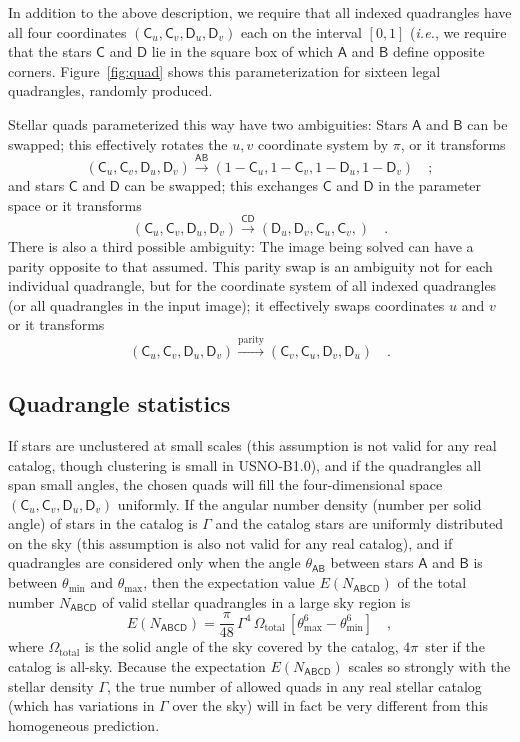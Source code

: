 \documentclass[12pt,preprint]{aastex}
\newcommand{\latin}[1]{\textit{#1}}
\newcommand{\ie}{\latin{i.e.}}
\newcommand{\usnob}{USNO-B1.0}
\newcommand{\starlabel}[1]{\mathsf{#1}}
\newcommand{\AAA}{\starlabel{A}}
\newcommand{\BBB}{\starlabel{B}}
\newcommand{\CCC}{\starlabel{C}}
\newcommand{\DDD}{\starlabel{D}}
\newcommand{\NABCD}{N_{\AAA\BBB\CCC\DDD}}
\newcommand{\ENABCD}{E(\NABCD)}
\newcommand{\thetaAB}{\theta_{\AAA\BBB}}
\newcommand{\thetamin}{\theta_\mathrm{min}}
\newcommand{\thetamax}{\theta_\mathrm{max}}
\begin{document}
In addition to the above description, we require that all indexed
quadrangles have all four coordinates $(\CCC_u,\CCC_v,\DDD_u,\DDD_v)$
each on the interval $[0,1]$ (\ie, we require that the stars $\CCC$
and $\DDD$ lie in the square box of which $\AAA$ and $\BBB$ define
opposite corners.  Figure~\ref{fig:quad} shows this parameterization
for sixteen legal quadrangles, randomly produced.

Stellar quads parameterized this way have two ambiguities:  Stars
$\AAA$ and $\BBB$ can be swapped; this effectively rotates the $u,v$
coordinate system by $\pi$, or it transforms
\begin{equation}
(\CCC_u,\CCC_v,\DDD_u,\DDD_v) \stackrel{\AAA\BBB}{\rightarrow}
  (1-\CCC_u,1-\CCC_v,1-\DDD_u,1-\DDD_v) \quad ;
\end{equation}
and stars $\CCC$ and $\DDD$ can be swapped; this exchanges $\CCC$ and
$\DDD$ in the parameter space or it transforms
\begin{equation}
(\CCC_u,\CCC_v,\DDD_u,\DDD_v) \stackrel{\CCC\DDD}{\rightarrow}
  (\DDD_u,\DDD_v,\CCC_u,\CCC_v,) \quad .
\end{equation}
There is also a third possible ambiguity: The image being solved can
have a parity opposite to that assumed.  This parity swap is an
ambiguity not for each individual quadrangle, but for the coordinate
system of all indexed quadrangles (or all quadrangles in the input
image); it effectively swaps coordinates $u$ and $v$ or it transforms
\begin{equation}
(\CCC_u,\CCC_v,\DDD_u,\DDD_v) \stackrel{\mathrm{parity}}{\rightarrow}
  (\CCC_v,\CCC_u,\DDD_v,\DDD_u) \quad .
\end{equation}

\subsection{Quadrangle statistics}

If stars are unclustered at small scales (this assumption is not valid
for any real catalog, though clustering is small in \usnob), and if
the quadrangles all span small angles, the chosen quads will fill the
four-dimensional space $(\CCC_u,\CCC_v,\DDD_u,\DDD_v)$ uniformly.  If
the angular number density (number per solid angle) of stars in the
catalog is $\Gamma$ and the catalog stars are uniformly distributed on
the sky (this assumption is also not valid for any real catalog), and
if quadrangles are considered only when the angle $\thetaAB$ between
stars $\AAA$ and $\BBB$ is between $\thetamin$ and $\thetamax$, then
the expectation value $\ENABCD$ of the total number $\NABCD$ of valid
stellar quadrangles in a large sky region is
\begin{equation}
\ENABCD = \frac{\pi}{48}\,\Gamma^4\,\Omega_\mathrm{total}\,
  [\thetamax^6-\thetamin^6] \quad ,
\end{equation}
where $\Omega_\mathrm{total}$ is the solid angle of the sky covered by
the catalog, $4\pi$~ster if the catalog is all-sky.  Because the
expectation $\ENABCD$ scales so strongly with the stellar density
$\Gamma$, the true number of allowed quads in any real stellar catalog
(which has variations in $\Gamma$ over the sky) will in fact be very
different from this homogeneous prediction.
\end{document}
